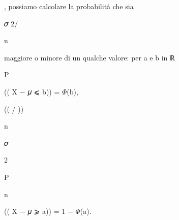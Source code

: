 \documentclass[a4paper,portrait,12pt]{article}
\begin{document}
\begin{flushleft}
, possiamo calcolare la probabilit\`{a} che sia
\end{flushleft}





\begin{flushleft}
𝜎 2/
\end{flushleft}


\begin{flushleft}
n
\end{flushleft}





\begin{flushleft}
maggiore o minore di un qualche valore: per a e b in ℝ
\end{flushleft}


\begin{flushleft}
P
\end{flushleft}





\begin{flushleft}
(( X $-$ 𝜇 ⩽ b)) = $\Phi$(b),
\end{flushleft}


(( / ))


\begin{flushleft}
n
\end{flushleft}





\begin{flushleft}
𝜎
\end{flushleft}





2





\begin{flushleft}
P
\end{flushleft}





\begin{flushleft}
n
\end{flushleft}





\begin{flushleft}
(( X $-$ 𝜇 ⩾ a)) = 1 $-$ $\Phi$(a).
\end{flushleft}
\end{document}
